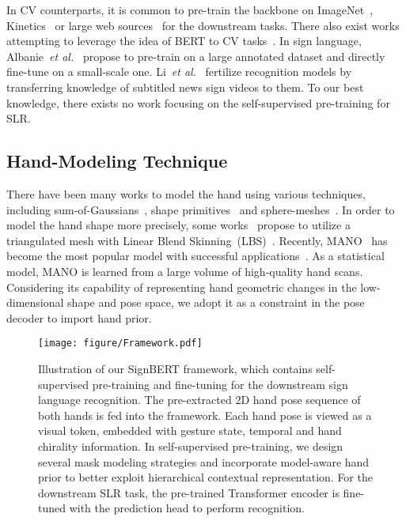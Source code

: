 \documentclass[10pt,twocolumn,letterpaper]{article}
\begin{document}
In CV counterparts, it is common to pre-train the backbone on ImageNet~\cite{deng2009imagenet}, Kinetics~\cite{carreira2017quo} or large web sources~\cite{duan2020omni} for the downstream tasks.
There also exist works attempting to leverage the idea of BERT to CV tasks~\cite{sun2019videobert,Su2020VLBERT,li2020unicoder,Zhu_2020_CVPR,chen2020generative}.
In sign language, Albanie~\emph{et al.}~\cite{albanie2020bsl} propose to pre-train on a large annotated dataset and directly fine-tune on a small-scale one.
Li~\emph{et al.}~\cite{li2020transfer} fertilize recognition models by transferring knowledge of subtitled news sign videos to them.
To our best knowledge, there exists no work focusing on the self-supervised pre-training for SLR.



\subsection{Hand-Modeling Technique}
There have been many works to model the hand using various techniques, including sum-of-Gaussians~\cite{sridhar2013interactive}, shape primitives~\cite{oikonomidis2014evolutionary, qian2014realtime} and sphere-meshes~\cite{tkach2016sphere}. 
In order to model the hand shape more precisely, some works~\cite{ballan2012motion, tzionas2016capturing} propose to utilize a triangulated mesh with Linear Blend Skinning~(LBS)~\cite{lewis2000pose}. 
Recently, MANO~\cite{romero2017embodied} has become the most popular model with successful applications~\cite{habermann2020deepcap, boukhayma20193d, hu2021model, hu2021hand}. 
As a statistical model, MANO is learned from a large volume of high-quality hand scans.
Considering its capability of representing hand geometric changes in the low-dimensional shape and pose space, we adopt it as a constraint in the pose decoder to import hand prior.




\begin{figure*}
	\centering
	\texttt{[image: figure/Framework.pdf]}\caption{Illustration of our SignBERT framework, which contains self-supervised pre-training and fine-tuning for the downstream sign language recognition. The pre-extracted 2D hand pose sequence of both hands is fed into the framework. Each hand pose is viewed as a visual token, embedded with gesture state, temporal and hand chirality information. In self-supervised pre-training, we design several mask modeling strategies and incorporate model-aware hand prior to better exploit hierarchical contextual representation. For the downstream SLR task, the pre-trained Transformer encoder is fine-tuned with the prediction head to perform recognition.}
	\label{fig:overview}
	\vspace{-0.2cm}
\end{figure*}
\end{document}
